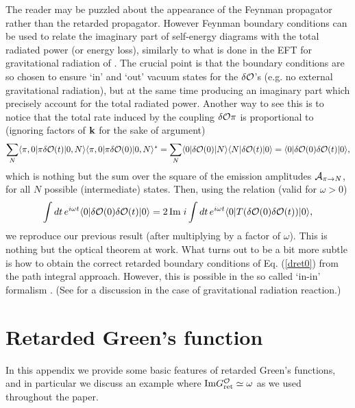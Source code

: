 \documentclass[11pt,amsmath,floats,floatfix,nofootinbib,secnumarabic, superscriptaddress, tightenlines]{revtex4}
\newcommand{\beq}{\begin{equation}}
\newcommand{\eeq}{\end{equation}}
\newcommand{\be}{\begin{equation}}
\newcommand{\ee}{\end{equation}}
\newcommand{\calo}{{\cal O}}
\begin{document}
{The reader may be puzzled about the appearance of the Feynman propagator rather than the retarded propagator. However Feynman boundary conditions can be used to relate the imaginary part of self-energy diagrams with the total radiated power (or energy loss), similarly to what is done in the EFT for gravitational radiation of \cite{nrgr2,nrgr2p,nrgr2p2,radgo,eftrev}. The crucial point is that the boundary conditions are so chosen to ensure `in' and `out' vacuum states for the $\delta\calo$'s (e.g. no external gravitational radiation), but at the same time producing an imaginary part which precisely account for the total radiated power. Another way to see this is to notice that the total rate induced by the coupling $\delta\calo \pi$ is proportional to (ignoring factors of ${\bf k}$ for the sake of argument)
\be
\sum_N    \langle \pi,0|\pi\delta\calo(t)|0,N\rangle \langle \pi,0| \pi\delta\calo(0)|0,N\rangle^\star = \sum_N  \langle 0|\delta\calo(0)|N\rangle \langle N|\delta\calo(t)|0\rangle = \langle 0| \delta\calo(0)\delta\calo(t)|0\rangle,
\ee
which is nothing but the sum over the square of the emission amplitudes ${\cal A}_{\pi \to N}$, for all $N$ possible (intermediate) states. Then, using the relation (valid for $\omega>0$)
\beq
\int dt\, e^{i\omega t} \langle 0| \delta\calo(0)\delta\calo(t)|0\rangle = 2\,{\rm Im}\; i \int dt\, e^{i\omega t} \langle 0| T(\delta\calo(0)\delta\calo(t))|0\rangle,
\eeq
we reproduce our previous result (after multiplying by a factor of $\omega$). This is nothing but the optical theorem at work. What turns out to be a bit more subtle is how to obtain the correct retarded boundary conditions of Eq. (\ref{dret0}) from the path integral approach. However, this is possible in the so called `in-in' formalism \cite{calzetta, weiss, Zhang}. (See \cite{radre} for a discussion in the case of gravitational radiation reaction.)


\section{Retarded Green's function} \label{appB}

In this appendix we provide some basic features of retarded Green's functions, and in particular we discuss an example where ${\rm Im}G^\calo_{\rm ret} \simeq \omega$ as we used throughout the paper.

}
\end{document}
